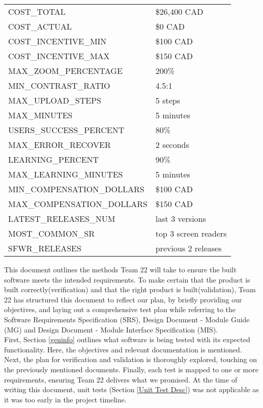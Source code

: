 \documentclass[12pt, titlepage]{article}
\begin{document}
\begin{longtable}{|p{8.0cm}|p{8.0cm}|}
  COST\_TOTAL & \$26,400 CAD \\
  COST\_ACTUAL & \$0 CAD \\
  COST\_INCENTIVE\_MIN & \$100 CAD \\
  COST\_INCENTIVE\_MAX & \$150 CAD \\
  MAX\_ZOOM\_PERCENTAGE & 200\% \\
  MIN\_CONTRAST\_RATIO & 4.5:1\\
  MAX\_UPLOAD\_STEPS & 5 steps\\
  MAX\_MINUTES & 5 minutes\\
  USERS\_SUCCESS\_PERCENT & 80\%\\
  MAX\_ERROR\_RECOVER & 2 seconds \\
  LEARNING\_PERCENT & 90\% \\
  MAX\_LEARNING\_MINUTES & 5 minutes \\
  MIN\_COMPENSATION\_DOLLARS & \$100 CAD \\
  MAX\_COMPENSATION\_DOLLARS & \$150 CAD \\
  LATEST\_RELEASES\_NUM & last 3 versions \\
  MOST\_COMMON\_SR & top 3 screen readers \\
  SFWR\_RELEASES & previous 2 releases \\

  \bottomrule
\end{longtable}

\newpage


\noindent This document outlines the methods Team 22 will take to
ensure the built software meets the intended requirements. To make
certain that the product is built correctly(verification) and that
the right product is built(validation), Team 22 has structured this
document to reflect our plan, by briefly providing our objectives,
and laying out a comprehensive test plan while referring to the
Software Requirements Specification (SRS), Design Document - Module
Guide (MG) and Design Document - Module Interface Specification (MIS). \\

First, Section \ref{geninfo} outlines what software is being tested
with its expected functionality. Here, the objectives and relevant
documentation is mentioned. Next, the plan for verification and
validation is thoroughly explored, touching on the previously
mentioned documents. Finally, each test is mapped to one or more
requirements, ensuring Team 22 delivers what we promised. At the time
of writing this document, unit tests (Section \ref{Unit Test Desc})
was not applicable as it was too early in the project timeline.\\
\end{document}
